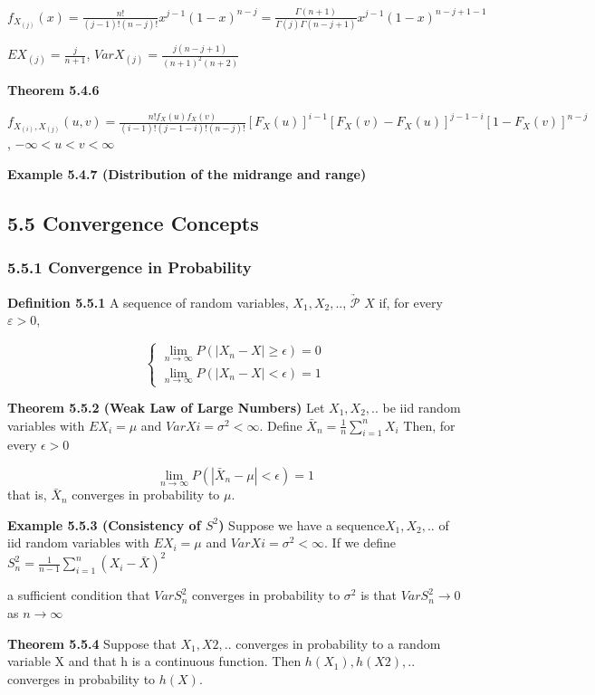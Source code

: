 \documentclass[6pt,twocolumn,Portrait]{article}
\begin{document}
\(f_{X_{(j)}}(x)=\frac{n!}{(j-1)!(n-j)!}x^{j-1}(1-x)^{n-j}=\frac{\Gamma(n+1)}{\Gamma(j)\Gamma(n-j+1)}x^{j-1}(1-x)^{n-j+1-1}\)

\(E{X_{(j)}}=\frac{j}{n+1}\),
\(Var{X_{(j)}}=\frac{j(n-j+1)}{(n+1)^2(n+2)}\)

\textbf{Theorem 5.4.6}

\(f_{X_{(i)},X_{(j)}}(u,v)=\frac{n!f_X(u)f_X(v)}{(i-1)!(j-1-i)!(n-j)!}[F_X(u)]^{i-1}[F_X(v)-F_X(u)]^{j-1-i}[1-F_X(v)]^{n-j}\),
\(-\infty<u<v<\infty\)

\textbf{Example 5.4.7 (Distribution of the midrange and range)}

\hypertarget{convergence-concepts}{%
\subsection{5.5 Convergence Concepts}\label{convergence-concepts}}

\hypertarget{convergence-in-probability}{%
\subsubsection{5.5.1 Convergence in
Probability}\label{convergence-in-probability}}

\textbf{Definition 5.5.1} A sequence of random variables,
\(X_1,X_2,..\), \(\underrightarrow{\mathcal{P}}\) \(X\) if, for every
\(\varepsilon>0\),

\[\begin{cases}\lim_{n\to\infty}P(|X_n-X|\ge\epsilon)=0\\\lim_{n\to\infty}P(|X_n-X|<\epsilon)=1\end{cases}\]

\textbf{Theorem 5.5.2 (Weak Law of Large Numbers)} Let \(X_1,X_2,..\) be
iid random variables with \(EX_i=\mu\) and \(Var Xi =\sigma^2<\infty\).
Define \(\bar X_n=\frac1n\sum_{i=1}^nX_i\) Then, for every
\(\epsilon>0\)

\[\lim_{n\to\infty}P(|\bar X_n-\mu|<\epsilon)=1\] that is, \(\bar X_n\)
converges in probability to \(\mu\).

\textbf{Example 5.5.3 (Consistency of \(S^2\))} Suppose we have a
sequence\(X_1,X_2,..\) of iid random variables with \(EX_i=\mu\) and
\(Var Xi =\sigma^2<\infty\). If we define
\(S_n^2=\frac1{n-1}\sum_{i=1}^n(X_i-\bar X)^2\)

a sufficient condition that \(VarS^2_n\) converges in probability to
\(\sigma^2\) is that \(VarS^2_n\to0\) as \(n\to\infty\)

\textbf{Theorem 5.5.4} Suppose that \(X_1, X2,..\) converges in
probability to a random variable X and that h is a continuous function.
Then \(h(X_1),h(X2),..\) converges in probability to \(h(X)\).
\end{document}
